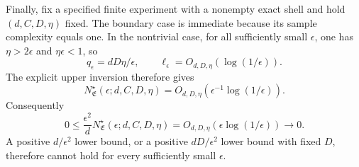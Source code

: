 Finally, fix a specified finite experiment with a nonempty exact shell and hold \((d,C,D,\eta)\) fixed. The boundary case is immediate because its sample complexity equals one. In the nontrivial case, for all sufficiently small \(\epsilon\), one has \(\eta>2\epsilon\) and \(\eta\epsilon<1\), so
\[
q_\epsilon=dD\eta/\epsilon,
\qquad
\ell_\epsilon=O_{d,D,\eta}(\log(1/\epsilon)).
\]
The explicit upper inversion therefore gives
\[
N^\star_{\mathfrak E}(\epsilon;d,C,D,\eta)
=O_{d,D,\eta}\left(\epsilon^{-1}\log(1/\epsilon)\right).
\]
Consequently
\[
0\le\frac{\epsilon^2}{d}N^\star_{\mathfrak E}(\epsilon;d,C,D,\eta)
=O_{d,D,\eta}\left(\epsilon\log(1/\epsilon)\right)\longrightarrow0.
\]
A positive \(d/\epsilon^2\) lower bound, or a positive \(dD/\epsilon^2\) lower bound with fixed \(D\), therefore cannot hold for every sufficiently small \(\epsilon\).